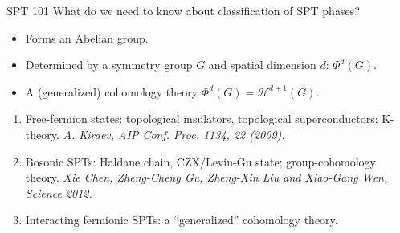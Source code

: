 \documentclass[xcolor=table, 11pt, aspectratio=169]{beamer}
\begin{document}
\begin{frame}{SPT 101}
  What do we need to know about classification of SPT phases?
  \begin{itemize}
  \item Forms an Abelian group.
  \item Determined by a symmetry group $G$ and spatial dimension $d$: $\Phi^d(G)$.
  \item A (generalized) cohomology theory $\Phi^d(G)=\mathcal H^{d+1}(G)$.
  \end{itemize}
  \begin{enumerate}
    \item Free-fermion states: topological insulators, topological superconductors; K-theory.
    \emph{A. Kiraev, AIP Conf. Proc. 1134, 22 (2009).}
    \item Bosonic SPTs: Haldane chain, CZX/Levin-Gu state; group-cohomology theory.
    \emph{Xie Chen, Zheng-Cheng Gu, Zheng-Xin Liu and Xiao-Gang Wen, Science 2012.}
        \item Interacting fermionic SPTs: a ``generalized'' cohomology theory.
  \end{enumerate}
  \end{frame}
\end{document}
